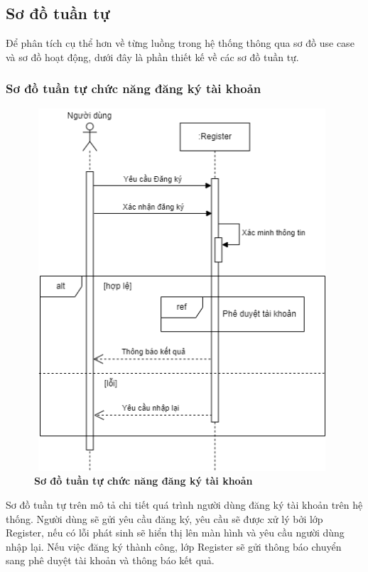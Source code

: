 \subsection{Sơ đồ tuần tự}
Để phân tích cụ thể hơn về từng luồng trong hệ thống thông qua sơ đồ use case và sơ đồ hoạt động, dưới đây là phần thiết kế
 về các sơ đồ tuần tự.

\subsubsection{Sơ đồ tuần tự chức năng đăng ký tài khoản}
\begin{figure}[H]
  \centering
  \includegraphics[width=11cm,height=13.5cm]{Images/sequence/sequence_register.png}
  \caption[Sơ đồ tuần tự chức năng đăng ký tài khoản]{\bfseries \fontsize{12pt}{0pt}
  \selectfont Sơ đồ tuần tự chức năng đăng ký tài khoản}
  \label{sequence_register} %
\end{figure}
Sơ đồ tuần tự trên mô tả chi tiết quá trình người dùng đăng ký tài khoản trên hệ thống. Người dùng sẽ gửi yêu cầu đăng ký, yêu cầu sẽ được xử lý
bởi lớp Register, nếu có lỗi phát sinh sẽ hiển thị lên màn hình và yêu cầu người dùng nhập lại. Nếu việc đăng ký thành công, lớp Register sẽ gửi thông báo 
chuyển sang phê duyệt tài khoản và thông báo kết quả.  

